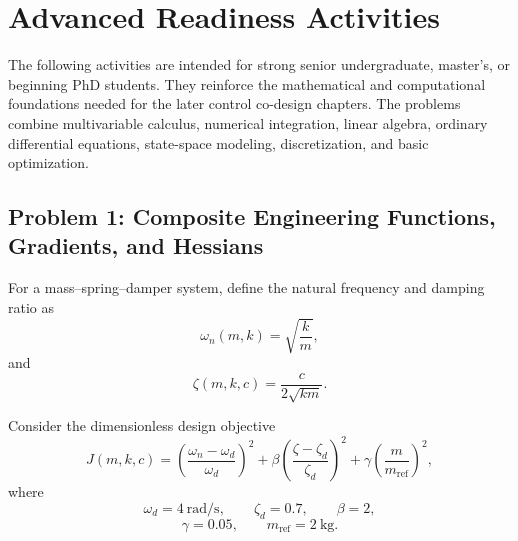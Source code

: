 
\section{Advanced Readiness Activities}

The following activities are intended for strong senior undergraduate,
master's, or beginning PhD students. They reinforce the mathematical and
computational foundations needed for the later control co-design chapters.
The problems combine multivariable calculus, numerical integration, linear
algebra, ordinary differential equations, state-space modeling, discretization,
and basic optimization.

\subsection*{Problem 1: Composite Engineering Functions, Gradients, and Hessians}

For a mass--spring--damper system, define the natural frequency and damping
ratio as
\begin{equation}
\omega_n(m,k)
=
\sqrt{\frac{k}{m}},
\end{equation}
and
\begin{equation}
\zeta(m,k,c)
=
\frac{c}{2\sqrt{km}}.
\end{equation}

Consider the dimensionless design objective
\begin{equation}
J(m,k,c)
=
\left(
\frac{\omega_n-\omega_d}{\omega_d}
\right)^2
+
\beta
\left(
\frac{\zeta-\zeta_d}{\zeta_d}
\right)^2
+
\gamma
\left(
\frac{m}{m_{\mathrm{ref}}}
\right)^2,
\end{equation}
where
\begin{equation}
\omega_d=4~\mathrm{rad/s},
\qquad
\zeta_d=0.7,
\qquad
\beta=2,
\end{equation}
\begin{equation}
\gamma=0.05,
\qquad
m_{\mathrm{ref}}=2~\mathrm{kg}.
\end{equation}

